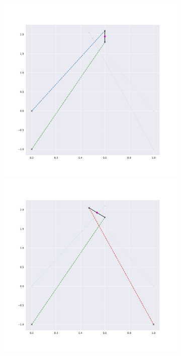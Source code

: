 \begin{figure}
\begin{subfigure}{0.23\textwidth}
    \end{subfigure}
    \begin{subfigure}{0.23\textwidth}
        \includegraphics[width=0.9\linewidth]{Plots/stereo_magic_2.pdf}
        \includegraphics[width=0.9\linewidth]{Plots/stereo_magic_6.pdf}
    \end{subfigure}
    \begin{subfigure}{0.23\textwidth}

\end{subfigure}
\end{figure}
